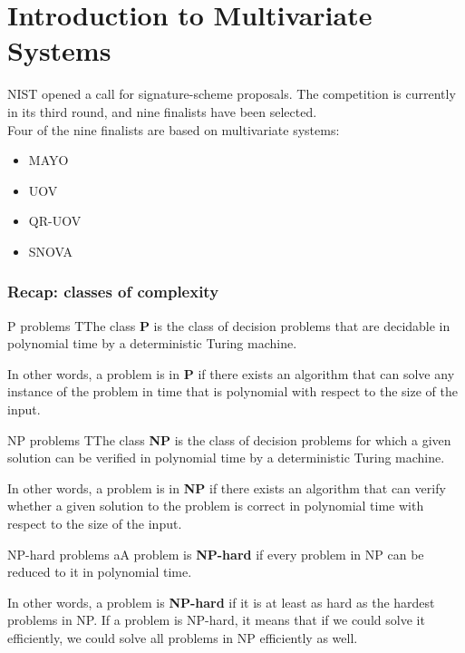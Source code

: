 \section{Introduction to Multivariate Systems}
NIST opened a call for signature-scheme proposals. The competition is currently in its third round, and nine finalists have been selected.\\
Four of the nine finalists are based on multivariate systems:
\begin{itemize}
    \item MAYO
    \item UOV
    \item QR-UOV
    \item SNOVA
\end{itemize}

\subsubsection*{Recap: classes of complexity}
\begin{defBox}{P problems}
    TThe class \textbf{P} is the class of decision problems that are decidable in polynomial time by a deterministic Turing machine.
\end{defBox}

\noindent
In other words, a problem is in \textbf{P} if there exists an algorithm that can solve any instance of the problem in time that is polynomial with respect to the size of the input.\\

\begin{defBox}{NP problems}
    TThe class \textbf{NP} is the class of decision problems for which a given solution can be verified in polynomial time by a deterministic Turing machine.
\end{defBox}


\noindent
In other words, a problem is in \textbf{NP} if there exists an algorithm that can verify whether a given solution to the problem is correct in polynomial time with respect to the size of the input.\\

\begin{defBox}{NP-hard problems}
    aA problem is \textbf{NP-hard} if every problem in NP can be reduced to it in polynomial time.
\end{defBox}
\noindent
In other words, a problem is \textbf{NP-hard} if it is at least as hard as the hardest problems in NP. If a problem is NP-hard, it means that if we could solve it efficiently, we could solve all problems in NP efficiently as well.\\

